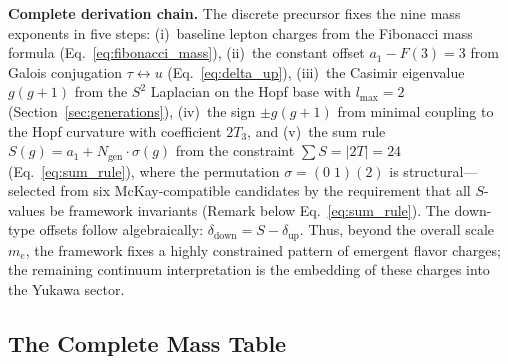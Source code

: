 \documentclass[12pt,a4paper]{article}
\theoremstyle{definition}
\begin{document}
\textbf{Complete derivation chain.} The discrete precursor fixes the nine mass exponents in five steps: (i)~baseline lepton charges from the Fibonacci mass formula (Eq.~\eqref{eq:fibonacci_mass}), (ii)~the constant offset $a_1 - F(3) = 3$ from Galois conjugation $\tau \leftrightarrow u$ (Eq.~\eqref{eq:delta_up}), (iii)~the Casimir eigenvalue $g(g+1)$ from the $S^2$ Laplacian on the Hopf base with $l_{\max} = 2$ (Section~\ref{sec:generations}), (iv)~the sign $\pm g(g+1)$ from minimal coupling to the Hopf curvature with coefficient $2T_3$, and (v)~the sum rule $S(g) = a_1 + N_{\text{gen}} \cdot \sigma(g)$ from the constraint $\sum S = |2T| = 24$ (Eq.~\eqref{eq:sum_rule}), where the permutation $\sigma = (0\;1)(2)$ is structural---selected from six McKay-compatible candidates by the requirement that all $S$-values be framework invariants (Remark below Eq.~\eqref{eq:sum_rule}). The down-type offsets follow algebraically: $\delta_{\text{down}} = S - \delta_{\text{up}}$.  Thus, beyond the overall scale $m_e$, the framework fixes a highly constrained pattern of emergent flavor charges; the remaining continuum interpretation is the embedding of these charges into the Yukawa sector.

\subsection{The Complete Mass Table}
\end{document}
